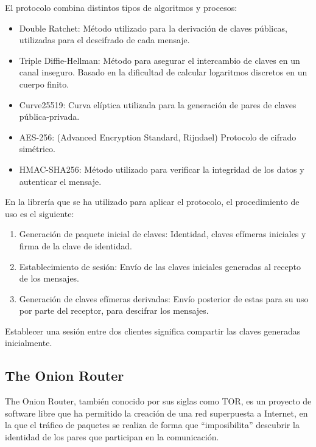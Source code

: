 El protocolo combina distintos tipos de algoritmos y procesos: 
\begin{itemize}
\item {Double Ratchet:} Método utilizado para la derivación de claves públicas, utilizadas para el descifrado de cada mensaje. 
\item {Triple Diffie-Hellman:} Método para asegurar el intercambio de claves en un canal inseguro. Basado en la dificultad de calcular logaritmos discretos en un cuerpo finito.
\item {Curve25519:} Curva elíptica utilizada para la generación de pares de claves pública-privada.
\item {AES-256:} (Advanced Encryption Standard, Rijndael) Protocolo de cifrado simétrico.
\item {HMAC-SHA256:} Método utilizado para verificar la integridad de los datos y autenticar el mensaje.
\end{itemize}

En la librería que se ha utilizado para aplicar el protocolo, el procedimiento de uso es el siguiente: \\

\begin{enumerate}
	\item {Generación de paquete inicial de claves:} Identidad, claves efímeras iniciales y firma de la clave de identidad.
	\item {Establecimiento de sesión:} Envío de las claves iniciales generadas al recepto de los mensajes.
	\item {Generación de claves efímeras derivadas}: Envío posterior de estas para su uso por parte del receptor, para descifrar los mensajes.
\end{enumerate}

Establecer una sesión entre dos clientes significa compartir las claves generadas inicialmente.

\subsection {The Onion Router}

The Onion Router, también conocido por sus siglas como TOR, es un proyecto de software libre que ha permitido la creación de una red superpuesta a Internet, en la que el tráfico de paquetes se realiza de forma que \hyphenquote{spanish}{imposibilita} descubrir la identidad de los pares que participan en la comunicación. \\

